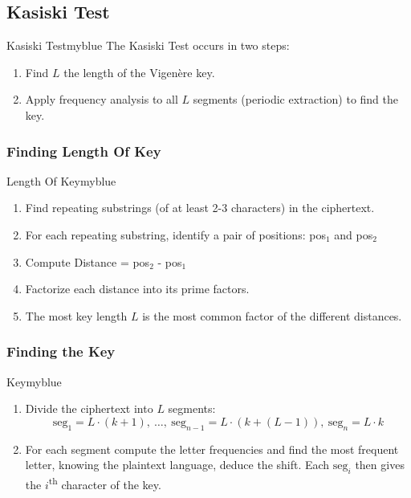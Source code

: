 \vspace{0.5cm}


\subsection{Kasiski Test}
\begin{prettyBox}{Kasiski Test}{myblue}
    The Kasiski Test occurs in two steps:
    \begin{enumerate}
        \item Find \(L\) the length of the Vigenère key.
        \item Apply frequency analysis to all \(L\) segments (periodic extraction) to find the key.
    \end{enumerate}
\end{prettyBox}

\vspace{0.25cm}

\subsubsection{Finding Length Of Key}
\begin{prettyBox}{Length Of Key}{myblue}
\begin{enumerate}
    \item Find repeating substrings (of at least 2-3 characters) in the ciphertext.
    \item For each repeating substring, identify a pair of positions: pos\(_1\) and pos\(_2\)
    \item Compute Distance = pos\(_2\) - pos\(_1\)
    \item Factorize each distance into its prime factors.
    \item The most key length \(L\) is the most common factor of the different distances.
\end{enumerate}
\end{prettyBox}

\vspace{0.25cm}


\subsubsection{Finding the Key}

\begin{prettyBox}{Key}{myblue}
\begin{enumerate}
    \item Divide the ciphertext into \(L\) segments:  
    \[
      \mathrm{seg}_1 = L\cdot (k+1),\ \dots,\ \mathrm{seg}_{n-1} = L\cdot (k+(L-1)),\ \mathrm{seg}_n = L\cdot k
    \]
    \item For each segment compute the letter frequencies and find the most frequent letter, knowing the plaintext language, deduce the shift. Each \(\mathrm{seg}_i\) then gives the \(i\)\textsuperscript{th} character of the key.
\end{enumerate}
\end{prettyBox}

